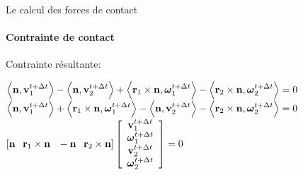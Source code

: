 \begin{frame}{Le calcul des forces de contact}
    \framesubtitle{Contrainte de contact}
    \begin{description}
        \item[Contrainte résultante:]
    \end{description}
    \begin{math}
        \left< {\bf n}, {\bf v}_1^{t + \Delta t} \right> -
        \left< {\bf n}, {\bf v}_2^{t + \Delta t} \right> +
        \left<{\bf r}_1 \times {\bf n}, \boldsymbol\omega_1^{t + \Delta t} \right> -
        \left<{\bf r}_2 \times {\bf n}, \boldsymbol\omega_2^{t + \Delta t} \right>
        = 0
    \end{math}
    \pause
    \mbox{}\\[1em]
    \begin{math}
        \left< {\bf n}, {\bf v}_1^{t + \Delta t} \right> +
        \left<{\bf r}_1 \times {\bf n}, \boldsymbol\omega_1^{t + \Delta t} \right> -
        \left< {\bf n}, {\bf v}_2^{t + \Delta t} \right> -
        \left<{\bf r}_2 \times {\bf n}, \boldsymbol\omega_2^{t + \Delta t} \right>
        = 0
    \end{math}
    \pause
    \mbox{}\\[1em]
    \begin{math}
        \left[
            {\bf n}                                \hspace{0.75em}
            {\bf r}_1 \times {\bf n} \hspace{0.75em}
            -{\bf n}                               \hspace{0.75em}
            {\bf r}_2 \times {\bf n}
        \right]
        \left[
            \begin{array}{c}
            {\bf v}_1^{t + \Delta t}      \\
            \boldsymbol\omega_1^{t + \Delta t} \\
            {\bf v}_2^{t + \Delta t}      \\
            \boldsymbol\omega_2^{t + \Delta t}
            \end{array}
        \right]
        = 0
    \end{math}
    \pause
    \mbox{}\\[1em]
    \begin{center}
    \end{center}
\end{frame}
